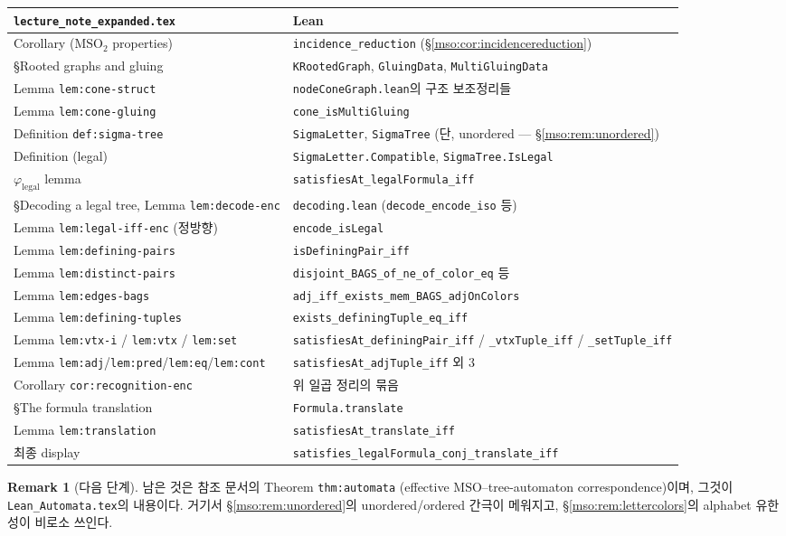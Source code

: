 \documentclass[11pt]{article}
\theoremstyle{definition}
\newtheorem{remark}[definition]{Remark}
\theoremstyle{plain}
\newcommand{\MSO}{\mathrm{MSO}}
\newcommand{\MSOtwo}{\mathrm{MSO}_2}
\newcommand{\lean}[1]{\texttt{#1}}
\newcommand{\leanfile}[1]{\texttt{#1}}
\begin{document}
\begin{center}
\begin{tabular}{p{}p{}}
\hline
\leanfile{lecture\_note\_expanded.tex} & Lean \\
\hline
Corollary ($\MSOtwo$ properties) &
  \lean{incidence\_reduction} (\S\ref{mso:cor:incidencereduction}) \\
\S Rooted graphs and gluing &
  \lean{KRootedGraph}, \lean{GluingData}, \lean{MultiGluingData} \\
Lemma \lean{lem:cone-struct} &
  \lean{nodeConeGraph.lean}의 구조 보조정리들 \\
Lemma \lean{lem:cone-gluing} &
  \lean{cone\_isMultiGluing} \\
Definition \lean{def:sigma-tree} &
  \lean{SigmaLetter}, \lean{SigmaTree} (단, unordered --- \S\ref{mso:rem:unordered}) \\
Definition (legal) &
  \lean{SigmaLetter.Compatible}, \lean{SigmaTree.IsLegal} \\
$\varphi_{\mathrm{legal}}$ lemma &
  \lean{satisfiesAt\_legalFormula\_iff} \\
\S Decoding a legal tree, Lemma \lean{lem:decode-enc} &
  \lean{decoding.lean} (\lean{decode\_encode\_iso} 등) \\
Lemma \lean{lem:legal-iff-enc} (정방향) &
  \lean{encode\_isLegal} \\
Lemma \lean{lem:defining-pairs} &
  \lean{isDefiningPair\_iff} \\
Lemma \lean{lem:distinct-pairs} &
  \lean{disjoint\_BAGS\_of\_ne\_of\_color\_eq} 등 \\
Lemma \lean{lem:edges-bags} &
  \lean{adj\_iff\_exists\_mem\_BAGS\_adjOnColors} \\
Lemma \lean{lem:defining-tuples} &
  \lean{exists\_definingTuple\_eq\_iff} \\
Lemma \lean{lem:vtx-i} / \lean{lem:vtx} / \lean{lem:set} &
  \lean{satisfiesAt\_definingPair\_iff} / \lean{\_vtxTuple\_iff} / \lean{\_setTuple\_iff} \\
Lemma \lean{lem:adj}/\lean{lem:pred}/\lean{lem:eq}/\lean{lem:cont} &
  \lean{satisfiesAt\_adjTuple\_iff} 외 3 \\
Corollary \lean{cor:recognition-enc} &
  위 일곱 정리의 묶음 \\
\S The formula translation &
  \lean{Formula.translate} \\
Lemma \lean{lem:translation} &
  \lean{satisfiesAt\_translate\_iff} \\
최종 display &
  \lean{satisfies\_legalFormula\_conj\_translate\_iff} \\
\hline
\end{tabular}
\end{center}

\begin{remark}[다음 단계]
남은 것은 참조 문서의 Theorem \lean{thm:automata} (effective
$\MSO$--tree-automaton correspondence)이며, 그것이
\leanfile{Lean\_Automata.tex}의 내용이다. 거기서 \S\ref{mso:rem:unordered}의
unordered/ordered 간극이 메워지고, \S\ref{mso:rem:lettercolors}의 alphabet
유한성이 비로소 쓰인다.
\end{remark}
\end{document}
